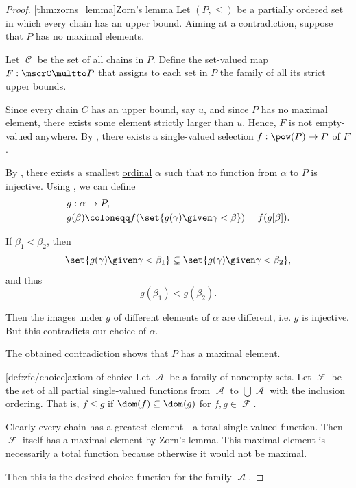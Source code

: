 \begin{proof}
  [thm:zorns_lemma]{Zorn's lemma} Let \( (P, \leq) \) be a partially ordered set in which every chain has an upper bound. Aiming at a contradiction, suppose that \( P \) has no maximal elements.

  Let \( \mscrC \) be the set of all chains in \( P \). Define the set-valued map \( F: \mscrC \multto P \) that assigns to each set in \( P \) the family of all its strict upper bounds.

  Since every chain \( C \) has an upper bound, say \( u \), and since \( P \) has no maximal element, there exists some element strictly larger than \( u \). Hence, \( F \) is not empty-valued anywhere. By , there exists a single-valued selection \( f: \pow(P) \to P \) of \( F \).

  By , there exists a smallest \hyperref[def:ordinal]{ordinal} \( \alpha \) such that no function from \( \alpha \) to \( P \) is injective. Using , we can define
  \begin{equation*}
    \begin{aligned}
      &g: \alpha \to P, \\
      &g(\beta) \coloneqq f(\set{ g(\gamma) \given \gamma < \beta }) = f(g[\beta]). \\
    \end{aligned}
  \end{equation*}

  If \( \beta_1 < \beta_2 \), then
  \begin{equation*}
    \set{ g(\gamma) \given \gamma < \beta_1 }
    \subsetneq
    \set{ g(\gamma) \given \gamma < \beta_2 },
  \end{equation*}
  and thus
  \begin{equation*}
    g(\beta_1) < g(\beta_2).
  \end{equation*}

  Then the images under \( g \) of different elements of \( \alpha \) are different, i.e. \( g \) is injective. But this contradicts our choice of \( \alpha \).

  The obtained contradiction shows that \( P \) has a maximal element.

  [def:zfc/choice]{axiom of choice} Let \( \mscrA \) be a family of nonempty sets. Let \( \mscrF \) be the set of all \hyperref[def:partial_function]{partial single-valued functions} from \( \mscrA \) to \( \bigcup \mscrA \) with the inclusion ordering. That is, \( f \leq g \) if \( \dom(f) \subseteq \dom(g) \) for \( f, g \in \mscrF \).

  Clearly every chain has a greatest element - a total single-valued function. Then \( \mscrF \) itself has a maximal element by Zorn's lemma. This maximal element is necessarily a total function because otherwise it would not be maximal.

  Then this is the desired choice function for the family \( \mscrA \).
\end{proof}


